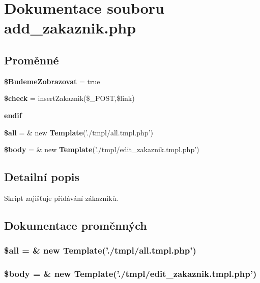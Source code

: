 \section{Dokumentace souboru add\_\-zakaznik.php}
\label{add__zakaznik_8php}
\subsection*{Proměnné}
\begin{CompactItemize}
\item 
{\bf \$BudemeZobrazovat} = true
\item 
{\bf \$check} = insertZakaznik(\$\_\-POST,\$link)
\item 
{\bf endif}
\item 
{\bf \$all} = \& new {\bf Template}('./tmpl/all.tmpl.php')
\item 
{\bf \$body} = \& new {\bf Template}('./tmpl/edit\_\-zakaznik.tmpl.php')
\end{CompactItemize}


\subsection{Detailní popis}
Skript zajišťuje přidávání zákazníků. 

\subsection{Dokumentace proměnných}
\subsubsection{\setlength{\rightskip}{0pt plus 5cm}\$all = \& new {\bf Template}('./tmpl/all.tmpl.php')}\label{add__zakaznik_8php_3c74ea9d2348c9aba28d36e692bef2d2}


\subsubsection{\setlength{\rightskip}{0pt plus 5cm}\$body = \& new {\bf Template}('./tmpl/edit\_\-zakaznik.tmpl.php')}\label{add__zakaznik_8php_26b9f9373f7bb79dfcf8a86dff086b45}


